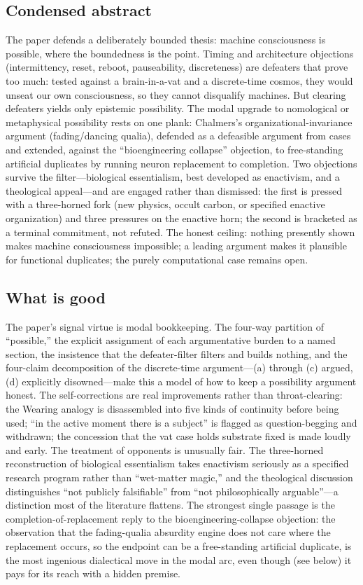 \documentclass[11pt]{article}
\begin{document}
\subsection{Condensed abstract}
The paper defends a deliberately bounded thesis: machine consciousness is possible, where the boundedness is the point. Timing and architecture objections (intermittency, reset, reboot, pauseability, discreteness) are defeaters that prove too much: tested against a brain-in-a-vat and a discrete-time cosmos, they would unseat our own consciousness, so they cannot disqualify machines. But clearing defeaters yields only epistemic possibility. The modal upgrade to nomological or metaphysical possibility rests on one plank: Chalmers's organizational-invariance argument (fading/dancing qualia), defended as a defeasible argument from cases and extended, against the ``bioengineering collapse'' objection, to free-standing artificial duplicates by running neuron replacement to completion. Two objections survive the filter---biological essentialism, best developed as enactivism, and a theological appeal---and are engaged rather than dismissed: the first is pressed with a three-horned fork (new physics, occult carbon, or specified enactive organization) and three pressures on the enactive horn; the second is bracketed as a terminal commitment, not refuted. The honest ceiling: nothing presently shown makes machine consciousness impossible; a leading argument makes it plausible for functional duplicates; the purely computational case remains open.

\subsection{What is good}
The paper's signal virtue is modal bookkeeping. The four-way partition of ``possible,'' the explicit assignment of each argumentative burden to a named section, the insistence that the defeater-filter filters and builds nothing, and the four-claim decomposition of the discrete-time argument---(a) through (c) argued, (d) explicitly disowned---make this a model of how to keep a possibility argument honest. The self-corrections are real improvements rather than throat-clearing: the Wearing analogy is disassembled into five kinds of continuity before being used; ``in the active moment there is a subject'' is flagged as question-begging and withdrawn; the concession that the vat case holds substrate fixed is made loudly and early. The treatment of opponents is unusually fair. The three-horned reconstruction of biological essentialism takes enactivism seriously as a specified research program rather than ``wet-matter magic,'' and the theological discussion distinguishes ``not publicly falsifiable'' from ``not philosophically arguable''---a distinction most of the literature flattens. The strongest single passage is the completion-of-replacement reply to the bioengineering-collapse objection: the observation that the fading-qualia absurdity engine does not care where the replacement occurs, so the endpoint can be a free-standing artificial duplicate, is the most ingenious dialectical move in the modal arc, even though (see below) it pays for its reach with a hidden premise.
\end{document}
